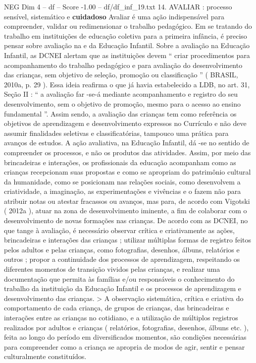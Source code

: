 \begin{textsample}{NEG Dim 4 – df – Score -1.00 – df/df\_inf\_19.txt}  \label{ex:f4_neg_064}
14.
AVALIAR : processo sensível, sistemático e \textbf{cuidadoso} Avaliar é uma ação indispensável para compreender, validar ou redimensionar o trabalho pedagógico.
Em se tratando do trabalho em instituições de educação coletiva para a primeira infância, é preciso pensar sobre avaliação na e da Educação Infantil.
Sobre a avaliação na Educação Infantil, as DCNEI alertam que as instituições devem “ criar procedimentos para acompanhamento do trabalho pedagógico e para avaliação do desenvolvimento das crianças, sem objetivo de seleção, promoção ou classificação ” ( BRASIL, 2010a, p. 29 ).
Essa ideia reafirma o que já havia estabelecido a LDB, no art. 31, Seção II : “ a avaliação far -se-á mediante acompanhamento e registro do seu desenvolvimento, sem o objetivo de promoção, mesmo para o acesso ao ensino fundamental ”.
Assim sendo, a avaliação das crianças tem como referência os objetivos de aprendizagem e desenvolvimento expressos no Currículo e não deve assumir finalidades seletivas e classificatórias, tampouco uma prática para avanços de estudos.
A ação avaliativa, na Educação Infantil, dá -se no sentido de compreender os processos, e não os produtos das atividades.
Assim, por meio das brincadeiras e interações, os profissionais da educação acompanham como as crianças recepcionam suas propostas e como se apropriam do patrimônio cultural da humanidade, como se posicionam nas relações sociais, como desenvolvem a criatividade, a imaginação, as experimentações e vivências e o fazem não para atribuir notas ou atestar fracassos ou avanços, mas para, de acordo com Vigotski ( 2012a ), atuar na zona de desenvolvimento iminente, a fim de colaborar com o desenvolvimento de novas formações nas crianças.
De acordo com as DCNEI, no que tange à avaliação, é necessário observar crítica e criativamente as ações, brincadeiras e interações das crianças ; utilizar múltiplas formas de registro feitos pelos adultos e pelas crianças, como fotografias, desenhos, álbuns, relatórios e outros ; propor a continuidade dos processos de aprendizagem, respeitando os diferentes momentos de transição vividos pelas crianças, e realizar uma documentação que permita às famílias e/ou responsáveis o conhecimento do trabalho da instituição da Educação Infantil e os processos de aprendizagem e desenvolvimento das crianças. > A observação sistemática, crítica e criativa do comportamento de cada criança, de grupos de crianças, das brincadeiras e interações entre as crianças no cotidiano, e a utilização de múltiplos registros realizados por adultos e crianças ( relatórios, fotografias, desenhos, álbuns etc. ), feita ao longo do período em diversificados momentos, são condições necessárias para compreender como a criança se apropria de modos de agir, sentir e pensar culturalmente constituídos.

\end{textsample}
